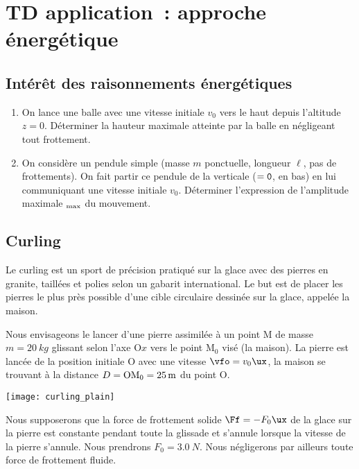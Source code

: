 \documentclass[a4paper, 12pt, final, garamond]{book}
\begin{document}
\setcounter{chapter}{3}

\chapter{TD application~: approche \'energ\'etique}

\section{Intérêt des raisonnements énergétiques}
\begin{enumerate}
    \item On lance une balle avec une vitesse initiale $v_0$ vers le haut depuis
        l'altitude $z = 0$. Déterminer la hauteur maximale atteinte par la balle
        en négligeant tout frottement.
    \item On considère un pendule simple (masse $m$ ponctuelle, longueur $\ell$,
        pas de frottements). On fait partir ce pendule de la verticale ($\tt =
        0$, en bas) en lui communiquant une vitesse initiale $v_0$. Déterminer
        l'expression de l'amplitude maximale $\tt_{\max}$ du mouvement.
\end{enumerate}

\section{Curling}
Le curling est un sport de précision pratiqué sur la glace avec des pierres en
granite, taillées et polies selon un gabarit international. Le but est de placer
les pierres le plus près possible d'une cible circulaire dessinée sur la glace,
appelée la maison. \bigbreak

\begin{minipage}{0.60\linewidth}
    Nous envisageons le lancer d'une pierre assimilée à un point M de masse $m =
    \SI{20}{kg}$ glissant selon l'axe O$x$ vers le point M$_0$ visé (la maison).
    La pierre est lancée de la position initiale O avec une vitesse $\vfo =
    v_0\ux$, la maison se trouvant à la distance $D = {\rm OM_0} = \SI{25}{m}$
    du point O.
\end{minipage}
\hfill
\begin{minipage}{0.35\linewidth}
    \begin{center}
        \texttt{[image: curling\_plain]}
    \end{center}
\end{minipage} \bigbreak

Nous supposerons que la force de frottement solide $\Ff = -F_0\ux$ de la glace
sur la pierre est constante pendant toute la glissade et s'annule lorsque la
vitesse de la pierre s'annule. Nous prendrons $F_0 = \SI{3.0}{N}$. Nous
négligerons par ailleurs toute force de frottement fluide.
\end{document}
